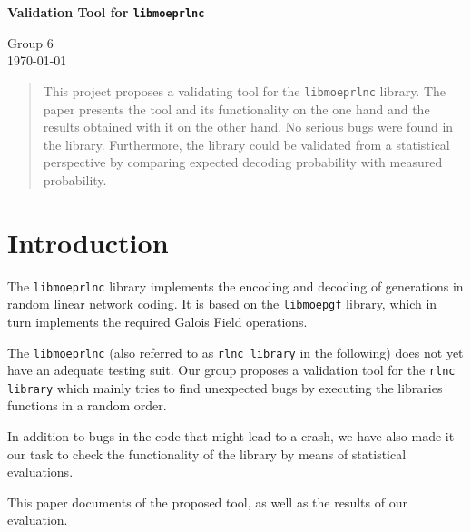 \documentclass[a4paper,english,10pt]{tumarticle}
\begin{document}
\begin{center}
	\bfseries\Large Validation Tool for \texttt{libmoeprlnc}\\[.5\baselineskip]
\end{center}
\begin{center}
	\small Group 6\\
	\today
\end{center}


\setcounter{tocdepth}{1}
\renewcommand{\contentsname}{Anlagen}

\renewcommand{\emph}[1]{%
	\textcolor{TUMBlue}{#1}%
}


\renewcommand{\abstractname}{Abstract}
\begin{abstract}
\setlength{\parindent}{0pt}
\noindent%
\footnotesize

This project proposes a validating tool for the \texttt{libmoeprlnc} library. 
The paper presents the tool and its functionality on the one hand and the results 
obtained with it on the other hand. No serious bugs were found in the library. Furthermore, 
the library could be validated from a statistical perspective by comparing expected decoding 
probability with measured probability.

\end{abstract}

\section{Introduction}

The \texttt{libmoeprlnc} library implements the encoding and decoding of generations in
random linear network coding. It is based on the \texttt{libmoepgf} library, which in turn
implements the required Galois Field operations.

The \texttt{libmoeprlnc} (also referred to as \texttt{rlnc library} in the following) does not yet have an 
adequate testing suit. Our group proposes a validation tool for the \texttt{rlnc library} which mainly tries to 
find unexpected bugs by executing the libraries functions in a random order.

In addition to bugs in the code that might lead to a crash, we have also made it our task to check the functionality 
of the library by means of statistical evaluations.

This paper documents of the proposed tool, as well as the results of our evaluation.
\end{document}
